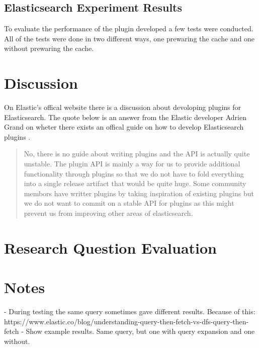\subsection{Elasticsearch Experiment Results}
To evaluate the performance of the plugin developed a few tests were conducted.
All of the tests were done in two different ways,
one prewaring the cache and one without prewaring the cache.

\section{Discussion}
On Elastic's offical website there is a discussion about devoloping plugins for Elasticsearch.
The quote below is an answer from the Elastic developer Adrien Grand on wheter there exists an offical guide on how to develop Elasticsearch plugins \cite{elasticsearch-plugin-quote}.

\begin{quote}
  No, there is no guide about writing plugins and the API is actually quite unstable.
  The plugin API is mainly a way for us to provide additional functionality through plugins so that we do not have to fold everything into a single release artifact that would be quite huge.
  Some community membors have writter plugins by taking inspiration of existing plugins but we do not want to commit on a stable API for plugins as this might prevent us from improving other areas of elasticsearch.
\end{quote}

\section{Research Question Evaluation}

\section{Notes}
- During testing the same query sometimes gave different results. Because of this: https://www.elastic.co/blog/understanding-query-then-fetch-vs-dfs-query-then-fetch
- Show example results. Same query, but one with query expansion and one without.
